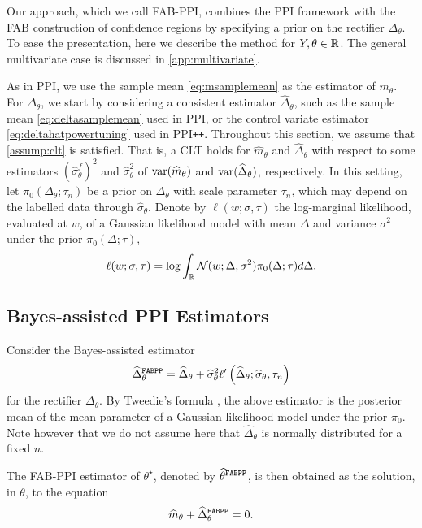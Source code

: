 Our approach, which we call FAB-PPI, combines the PPI framework with the FAB construction of confidence regions by specifying a prior on the rectifier $\Delta_\theta$. To ease the presentation, here we describe the method for $Y, \theta \in\mathbb R$. The general multivariate case is discussed in \cref{app:multivariate}.

As in PPI, we use the sample mean \eqref{eq:msamplemean} as the estimator of $m_\theta$.
For $\Delta_\theta$, we start by considering a consistent estimator $\widehat \Delta_\theta$, such as the sample mean \eqref{eq:deltasamplemean} used in PPI, or the control variate estimator \eqref{eq:deltahatpowertuning} used in PPI\texttt{++}.
Throughout this section, we assume that \cref{assump:clt} is satisfied. That is, a CLT holds for $\widehat{m}_\theta$ and $\widehat{\Delta}_\theta$ with respect to some estimators $(\widehat{\sigma}^f_\theta)^2$ and $\widehat{\sigma}^2_\theta$ of $\mathrm{var}(\widehat{m}_\theta)$ and $\mathrm{var}(\widehat{\Delta}_\theta)$, respectively.
In this setting, let $\pi_0(\Delta_\theta; \tau_n)$ be a prior on $\Delta_\theta$ with scale parameter $\tau_n$, which may depend on the labelled data through $\widehat \sigma_\theta$.
Denote by $\ell(w; \sigma, \tau)$ the log-marginal likelihood, evaluated at $w$, of a Gaussian likelihood model with mean $\Delta$ and variance $\sigma^2$ under the prior $\pi_0(\Delta; \tau)$,
\begin{align}
    \ell(w; \sigma, \tau) = \log \int_\mathbb R \mathcal N(w; \Delta,\sigma^2) \pi_0(\Delta; \tau) d\Delta. \nonumber
\end{align}

\subsection{Bayes-assisted PPI Estimators}
 Consider the Bayes-assisted estimator
\begin{align}
    \widehat\Delta_\theta^{\mathrm{\texttt{FABPP}}}= \widehat\Delta_\theta + \widehat\sigma_\theta^2 \ell'\left(\widehat\Delta_\theta; \widehat\sigma_\theta, \tau_n\right)
\label{eq:FABPPIestimatorDelta}
\end{align}
for the rectifier $\Delta_\theta$.
By Tweedie's formula \citep{}, the above estimator is the posterior mean of the mean parameter of a Gaussian likelihood model under the prior $\pi_0$.
Note however that we do not assume here that $\widehat\Delta_\theta$ is normally distributed for a fixed $n$.

The FAB-PPI estimator of $\theta^\star$, denoted by $\widehat \theta^{\mathrm{\texttt{FABPP}}}$, is then obtained as the solution, in $\theta$, to the equation
$$
    \widehat m_\theta + \widehat\Delta_\theta^{\mathrm{\texttt{FABPP}}} = 0.
$$

